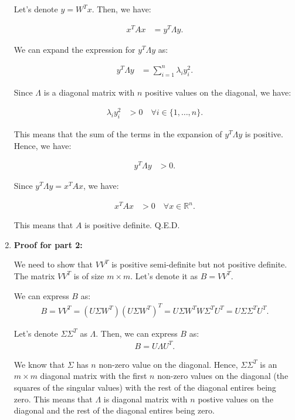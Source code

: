 \documentclass[11pt,onecolumn]{article}
\newcommand{\R}{\mathbb{R}}
\begin{document}
\begin{enumerate}
    Let's denote $y = W^T x$. Then, we have:

    \begin{align*}
        x^TAx &= y^T \Lambda y.
    \end{align*}

    We can expand the expression for $y^T \Lambda y$ as:

    \begin{align*}
        y^T \Lambda y &= \sum_{i=1}^n \lambda_i y_i^2.
    \end{align*}

    Since $\Lambda$ is a diagonal matrix with $n$ positive values on the diagonal, we have:

    \begin{align*}
        \lambda_i y_i^2 &> 0 \quad \forall i \in \{1, \ldots, n\}.
    \end{align*}

    This means that the sum of the terms in the expansion of $y^T \Lambda y$ is positive. Hence, we have:

    \begin{align*}
        y^T \Lambda y &> 0.
    \end{align*}

    Since $y^T \Lambda y = x^TAx$, we have:

    \begin{align*}
        x^TAx &> 0 \quad \forall x \in \R^n.
    \end{align*}

    This means that $A$ is positive definite. Q.E.D.
    
    \item \textbf{Proof for part 2:}
    
    We need to show that $VV^T$ is positive semi-definite but not positive definite. The matrix $VV^T$ is of size $m \times m$. Let's denote it as $B = VV^T$.
    
    We can express $B$ as:
    \begin{align*}
        B = VV^T = (U\Sigma W^T)(U\Sigma W^T)^T = U\Sigma W^T W \Sigma^T U^T = U\Sigma \Sigma^T U^T.
    \end{align*}

    Let's denote $\Sigma \Sigma^T$ as $\Lambda$. Then, we can express $B$ as:
    \begin{align*}
        B = U\Lambda U^T.
    \end{align*}

    We know that $\Sigma$ has $n$ non-zero value on the diagonal. Hence, $\Sigma \Sigma^T$ is an $m \times m$ diagonal matrix with the first $n$ non-zero values on the diagonal (the squares of the singular values) with the rest of the diagonal entires being zero. This means that $\Lambda$ is diagonal matrix with $n$ postive values on the diagonal and the rest of the diagonal entires being zero.


\end{enumerate}
\end{document}
